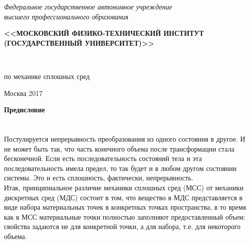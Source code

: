 \documentclass[a4papper, 14pt]{book}
\date{\today}
\theoremstyle{plain} %
\theoremstyle{definition} %
\theoremstyle{remark} %
\begin{document}
	\thispagestyle{empty}
	\begin{center}
		\textit{Федеральное государственное автономное учреждение \\
			высшего профессионального образования}
		\vspace{0.5ex}
		
		\textbf{ <<МОСКОВСКИЙ ФИЗИКО-ТЕХНИЧЕСКИЙ ИНСТИТУТ (ГОСУДАРСТВЕННЫЙ УНИВЕРСИТЕТ)>>}
	\end{center}
	\vspace{13ex}
	\begin{flushright}
		\noindent
		\\
	\end{flushright}
	\begin{center}
		\vspace{13ex}
		\vspace{1ex}
		
		по механике сплошных сред 
		
		
		
		
		\vfill
		Москва 2017
	\end{center}
	\newpage
	{\Large\textbf{Предисловие}}\\
	
	
	\newpage
	\tableofcontents
	\newpage
	\def\thesection{Введение}
	\section{}
	Постулируется непрерывность преобразования из одного состояния в другое. И не может быть так, что часть конечного объема после трансформации стала бесконечной. Если есть последовательность состояний тела и эта последовательность имела предел, то так будет и в любом другом состоянии системы. Это и есть сплошность, фактически, непрерывность. \\
	
	Итак, принципиальное различие механики сплошных сред (МСС) от механики дискретных сред (МДС) состоит в том, что вещество в МДС представляется в виде набора материальных точек в конкретных точках пространства, в то время как в МСС материальные точки полностью заполняют предоставленный объем: свойства задаются не для конкретной точки, а для набора, т.е. для некоторого объема. \\
	
\end{document}
